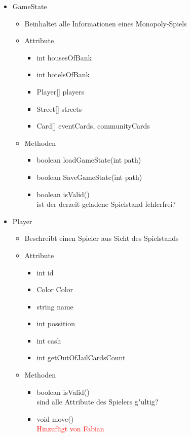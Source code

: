 \documentclass[a4paper,10pt]{article}
\begin{document}
\begin{itemize}

\item GameState
\begin{itemize}
\item Beinhaltet alle Informationen eines Monopoly-Spiels
\item Attribute
\begin{itemize}
\item int housesOfBank
\item int hotelsOfBank
\item Player[] players
\item Street[] streets
\item Card[] eventCards, communityCards
\end{itemize}
\item Methoden
\begin{itemize}
\item boolean loadGameState(int path)
\item boolean SaveGameState(int path)
\item boolean isValid()
\\ist der derzeit geladene Spielstand fehlerfrei?
\end{itemize}
\end{itemize}

\item Player
\begin{itemize}
\item Beschreibt einen Spieler aus Sicht des Spielstands
\item Attribute
\begin{itemize}
\item int id
\item Color Color
\item string name
\item int possition
\item int cash
\item int getOutOfJailCardsCount
\end{itemize}
\item Methoden
\begin{itemize}
\item boolean isValid()
\\sind alle Attribute des Spielers g"ultig?
\item void move()
\\ \textcolor{red}{Hinzufügt von Fabian}
\end{itemize}
\end{itemize}


\end{itemize}
\end{document}
